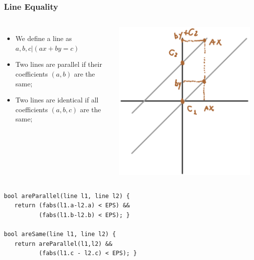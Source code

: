 \begin{frame}[fragile]
  \frametitle{Line Equality}
    \begin{columns}
      \begin{itemize}
      \item We define a line as $a,b,c|(ax+by=c)$

      \item Two lines are parallel if their coefficients $(a, b)$ are the same;\medskip

      \item Two lines are identical if all coefficients $(a,b,c)$ are the same;
      \end{itemize}
      \includegraphics[width=.7\textwidth]{../img/geom3}
    \end{columns}
  \begin{exampleblock}{}
\begin{verbatim}
bool areParallel(line l1, line l2) {
   return (fabs(l1.a-l2.a) < EPS) &&
          (fabs(l1.b-l2.b) < EPS); }

bool areSame(line l1, line l2) {
   return areParallel(l1,l2) &&
          (fabs(l1.c - l2.c) < EPS); }
\end{verbatim}
  \end{exampleblock}
\end{frame}

